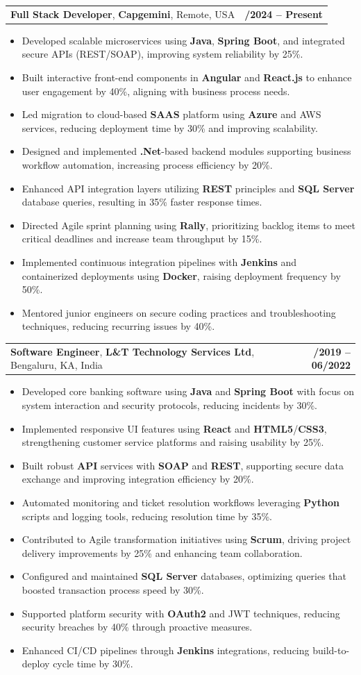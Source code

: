 \documentclass[letterpaper,11pt]{article}
\makeatletter
\newcommand{\resumeItem}[1]{
  \item\footnotesize{
    {#1 \vspace{-2pt}}
  }
}
\newcommand{\resumeSubheading}[4]{
  \vspace{-2pt}\item
    \begin{tabular*}{1.0\textwidth}[t]{l@{\extracolsep{\fill}}r}
      \textbf{\fontsize{10pt}{14pt}\selectfont #3}, \textbf{\fontsize{10pt}{14pt}\selectfont #1}, \fontsize{10pt}{14pt}\selectfont #4 & \textbf{\fontsize{10pt}{14pt}\selectfont #2} \\
    \end{tabular*}\vspace{-7pt}
}
\newcommand{\resumeItemListStart}{\begin{itemize}[leftmargin=*]}
\newcommand{\resumeItemListEnd}{\end{itemize}\vspace{-5pt}}
\makeatother
\begin{document}
    \resumeSubheading
        {Capgemini}{01/2024 -- Present}
        {Full Stack Developer}{Remote, USA}
      \resumeItemListStart
        \resumeItem{Developed scalable microservices using \textbf{Java}, \textbf{Spring Boot}, and integrated secure APIs (REST/SOAP), improving system reliability by 25\%.}
        \resumeItem{Built interactive front-end components in \textbf{Angular} and \textbf{React.js} to enhance user engagement by 40\%, aligning with business process needs.}
        \resumeItem{Led migration to cloud-based \textbf{SAAS} platform using \textbf{Azure} and AWS services, reducing deployment time by 30\% and improving scalability.}
        \resumeItem{Designed and implemented \textbf{.Net}-based backend modules supporting business workflow automation, increasing process efficiency by 20\%.}
        \resumeItem{Enhanced API integration layers utilizing \textbf{REST} principles and \textbf{SQL Server} database queries, resulting in 35\% faster response times.}
        \resumeItem{Directed Agile sprint planning using \textbf{Rally}, prioritizing backlog items to meet critical deadlines and increase team throughput by 15\%.}
        \resumeItem{Implemented continuous integration pipelines with \textbf{Jenkins} and containerized deployments using \textbf{Docker}, raising deployment frequency by 50\%.}
        \resumeItem{Mentored junior engineers on secure coding practices and troubleshooting techniques, reducing recurring issues by 40\%.}
      \resumeItemListEnd

    \resumeSubheading
        {L\&T Technology Services Ltd}{08/2019 -- 06/2022}
        {Software Engineer}{Bengaluru, KA, India}
      \resumeItemListStart
        \resumeItem{Developed core banking software using \textbf{Java} and \textbf{Spring Boot} with focus on system interaction and security protocols, reducing incidents by 30\%.}
        \resumeItem{Implemented responsive UI features using \textbf{React} and \textbf{HTML5}/\textbf{CSS3}, strengthening customer service platforms and raising usability by 25\%.}
        \resumeItem{Built robust \textbf{API} services with \textbf{SOAP} and \textbf{REST}, supporting secure data exchange and improving integration efficiency by 20\%.}
        \resumeItem{Automated monitoring and ticket resolution workflows leveraging \textbf{Python} scripts and logging tools, reducing resolution time by 35\%.}
        \resumeItem{Contributed to Agile transformation initiatives using \textbf{Scrum}, driving project delivery improvements by 25\% and enhancing team collaboration.}
        \resumeItem{Configured and maintained \textbf{SQL Server} databases, optimizing queries that boosted transaction process speed by 30\%.}
        \resumeItem{Supported platform security with \textbf{OAuth2} and JWT techniques, reducing security breaches by 40\% through proactive measures.}
        \resumeItem{Enhanced CI/CD pipelines through \textbf{Jenkins} integrations, reducing build-to-deploy cycle time by 30\%.}
      \resumeItemListEnd
\end{document}
